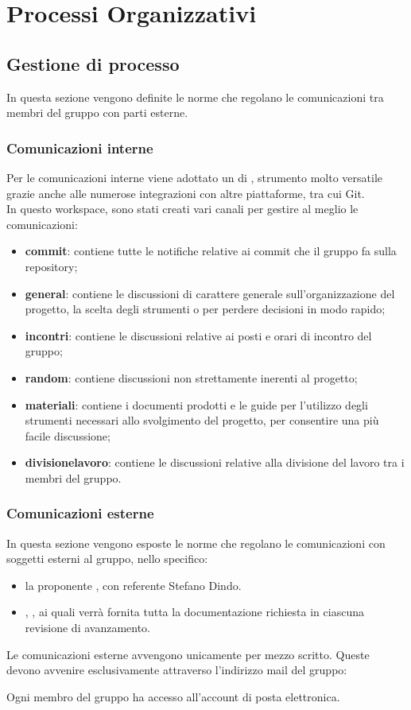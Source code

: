 \section{Processi Organizzativi}

\subsection{Gestione di processo}
In questa sezione vengono definite le norme che regolano le comunicazioni tra membri del gruppo con parti esterne.
\subsubsection{Comunicazioni interne}
Per le comunicazioni interne viene adottato un  di , 
strumento molto versatile grazie anche alle numerose integrazioni con altre piattaforme, tra cui Git. \\
In questo workspace, sono stati creati vari canali per gestire al meglio le comunicazioni:
\begin{itemize}
    \item \textbf{commit}: contiene tutte le notifiche relative ai commit che il gruppo fa sulla repository;
    \item \textbf{general}: contiene le discussioni di carattere generale sull'organizzazione del progetto, la scelta degli strumenti o per perdere decisioni in modo rapido;
    \item \textbf{incontri}: contiene le discussioni relative ai posti e orari di incontro del gruppo;
    \item \textbf{random}: contiene discussioni non strettamente inerenti al progetto;
    \item \textbf{materiali}: contiene i documenti prodotti e le guide per l'utilizzo degli strumenti necessari allo svolgimento del progetto, per consentire una più facile discussione;
    \item \textbf{divisionelavoro}: contiene le discussioni relative alla divisione del lavoro tra i membri del gruppo.
\end{itemize}
\subsubsection{Comunicazioni esterne}
In questa sezione vengono esposte le norme che regolano le comunicazioni con soggetti esterni al gruppo, nello specifico:
\begin{itemize}
    \item la proponente \proposerName{}, con referente Stefano Dindo.
    \item \commitNameM{}, \commitNameS{}, ai quali verrà fornita tutta la documentazione richiesta in ciascuna revisione di avanzamento.
\end{itemize}
Le comunicazioni esterne avvengono unicamente per mezzo scritto. Queste devono avvenire esclusivamente attraverso l'indirizzo mail del gruppo: 
\begin{center}
    \groupEmail
\end{center}
Ogni membro del gruppo ha accesso all'account di posta elettronica.

